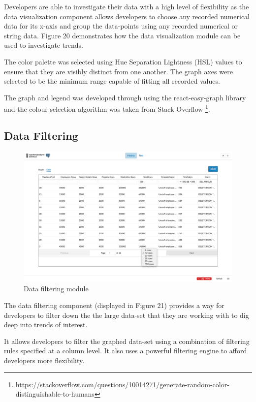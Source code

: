 \documentclass[12pt]{report}
\begin{document}
\begin{spacing}{1.9}
	Developers are able to investigate their data with a high level of flexibility as the data visualization component allows developers to choose any recorded numerical data for its x-axis and group the data-points using any recorded numerical or string data. Figure 20 demonstrates how the data visualization module can be used to investigate trends.
	
	The color palette was selected using Hue Separation Lightness (HSL) values to ensure that they are visibly distinct from one another. The graph axes were selected to be the minimum range capable of fitting all recorded values.
	
	The graph and legend was developed through using the react-easy-graph library and the colour selection algorithm was taken from Stack Overflow \footnote{https://stackoverflow.com/questions/10014271/generate-random-color-distinguishable-to-humans}.
	
	\subsection{Data Filtering}
	
	\begin{figure}[H]
		\centering
		\includegraphics[width=\textwidth]{3-6-3.png}
		\caption{Data filtering module}
		
	\end{figure}
	
	The data filtering component (displayed in Figure 21) provides a way for developers to filter down the the large data-set that they are working with to dig deep into trends of interest.
	
	It allows developers to filter the graphed data-set using a combination of filtering rules specified at a column level. It also uses a powerful filtering engine to afford developers more flexibility.
	

\end{spacing}
\end{document}
